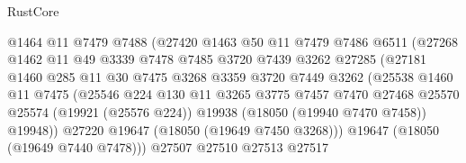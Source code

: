 \begin{lexlean}{RustCore}
\begin{coremodule}
                              @1464
                              @11
                              @7479
                              @7488
                              (@27420
                                @1463
                                @50
                                @11
                                @7479
                                @7486
                                @6511
                                (@27268
                                  @1462
                                  @11
                                  @49
                                  @3339
                                  @7478
                                  @7485
                                  @3720
                                  @7439
                                  @3262
                                  @27285
                                  (@27181
                                    @1460
                                    @285
                                    @11
                                    @30
                                    @7475
                                    @3268
                                    @3359
                                    @3720
                                    @7449
                                    @3262
                                    (@25538
                                      @1460
                                      @11
                                      @7475
                                      (@25546
                                        @224
                                        @130
                                        @11
                                        @3265
                                        @3775
                                        @7457
                                        @7470
                                        @27468
                                        @25570
                                        @25574
                                        (@19921 (@25576 @224))
                                        @19938
                                        (@18050 (@19940 @7470 @7458))
                                        @19948))
                                    @27220
                                    @19647
                                    (@18050 (@19649 @7450 @3268)))
                                  @19647
                                  (@18050 (@19649 @7440 @7478)))
                                @27507
                                @27510
                                @27513
                                @27517

\end{coremodule}
\end{lexlean}
